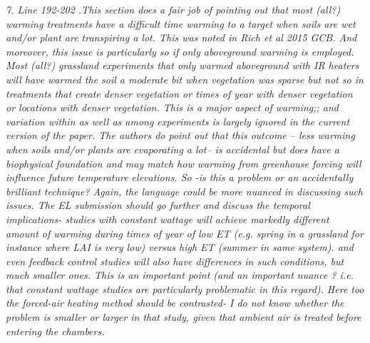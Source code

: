 \documentclass[11pt,a4paper]{letter}
\begin{document}
\par \emph{7. Line 192-202 .This section does a fair job of pointing out that most (all?) warming treatments have a difficult time warming to a target when soils are wet and/or plant are transpiring a lot. This was noted in Rich et al 2015 GCB. And moreover, this issue is particularly so if only aboveground warming is employed. Most (all?) grassland experiments that only warmed aboveground with IR heaters will have warmed the soil a moderate bit when vegetation was sparse but not so in treatments that create denser vegetation or times of year with denser vegetation or locations with denser vegetation. This is a major aspect of warming;; and variation within as well as among experiments is largely ignored in the current version of the paper. The authors do point out that this outcome -- less warming when soils and/or plants are evaporating a lot-- is accidental but does have a biophysical foundation and may match how warming from greenhouse forcing will influence future temperature elevations. So -is this a problem or an accidentally brilliant technique? Again, the language could be more nuanced in discussing such issues. The EL submission should go further and discuss the temporal implications- studies with constant wattage will achieve markedly different amount of warming during times of year of low ET (e.g. spring in a grassland for instance where LAI is very low) versus high ET (summer in same system). and even feedback control studies will also have differences in such conditions, but much smaller ones. This is an important point (and an important nuance ? i.e. that constant wattage studies are particularly problematic in this regard). Here too the forced-air heating method should be contrasted- I do not know whether the problem is smaller or larger in that study, given that ambient air is treated before entering the chambers.}
\end{document}
